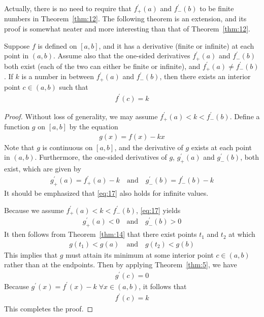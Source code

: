 \documentclass[thmcnt=section, 12pt]{my-elegantbook}
\begin{document}
\par Actually, there is no need to require that $f^\prime_{+}(a)$ and $f^\prime_{-}(b)$ to be finite numbers in Theorem~\ref{thm:12}. The following theorem is an extension, and its proof is somewhat neater and more interesting than that of Theorem~\ref{thm:12}.

\begin{theorem} \label{thm:13}
    Suppose $f$ is defined on $[a, b]$, and it has a derivative (finite or infinite) at each point in $(a, b)$. Assume also that the one-sided derivatives $f^\prime_{+}(a)$ and $f^\prime_{-}(b)$ both exist (each of the two can either be finite or infinite), and $f^\prime_{+}(a) \neq f^\prime_{-}(b)$. If $k$ is a number in between $f^\prime_{+}(a)$ and $f^\prime_{-}(b)$, then there exists an interior point $c \in (a, b)$ such that 
    \begin{align*}
        f^\prime(c) = k
    \end{align*}
\end{theorem}

\begin{proof}
    Without loss of generality, we may assume $f^\prime_{+}(a) < k <  f^\prime_{-}(b)$. Define a function $g$ on $[a, b]$ by the equation
    \begin{align*}
        g(x) = f(x) - kx
    \end{align*}
    Note that $g$ is continuous on $[a, b]$, and the derivative of $g$ exists at each point in $(a, b)$. Furthermore, the one-sided derivatives of $g$, $g^\prime_{+}(a)$ and $g^\prime_{-}(b)$, both exist, which are given by
    \begin{align}
        g^\prime_{+}(a) = f^\prime_{+}(a) - k
        \quad \text{and} \quad 
        g^\prime_{-}(b) = f^\prime_{-}(b) - k
        \label{eq:17}
    \end{align} 
    It should be emphasized that \eqref{eq:17} also holds for infinite values. 

    \par Because we assume $f^\prime_{+}(a) < k <  f^\prime_{-}(b)$, \eqref{eq:17} yields
    \begin{align*}
        g^\prime_{+}(a) < 0
        \quad \text{and} \quad 
        g^\prime_{-}(b) > 0
    \end{align*} 
    It then follows from Theorem~\ref{thm:14} that there exist points $t_1$ and $t_2$ at which
    \begin{align*}
        g(t_1) < g(a)
        \quad \text{and} \quad 
        g(t_2) < g(b)
    \end{align*}
    This implies that $g$ must attain its minimum at some interior point $c \in (a, b)$ rather than at the endpoints. Then by applying Theorem~\ref{thm:5}, we have 
    \begin{align*}
        g^\prime(c) = 0
    \end{align*}
    Because $g^\prime(x) = f^\prime(x) - k \; \forall x \in (a, b)$, it follows that
    \begin{align*}
        f^\prime(c) = k
    \end{align*}
    This completes the proof.
\end{proof}
\end{document}
